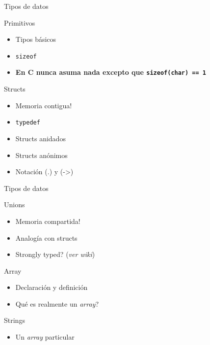 \documentclass{beamer}
\begin{document}
	\begin{frame}{Tipos de datos}
	\begin{block}{Primitivos}
		\begin{itemize}
			\item Tipos básicos
			\item \texttt{sizeof}
			\item \textbf{En C nunca asuma nada excepto que \texttt{sizeof(char) == 1}}
		\end{itemize}
	\end{block}
	
	\begin{block}{Structs}
		\begin{itemize}
			\item Memoria contigua!
			\item \texttt{typedef}
			\item Structs anidados
			\item Structs anónimos
			\item Notación (.) y (-\textgreater)
		\end{itemize}
	\end{block}
	\end{frame}
	
	\begin{frame}{Tipos de datos}
	\begin{block}{Unions}
		\begin{itemize}
			\item Memoria compartida!
			\item Analogía con structs
			\item Strongly typed? (\emph{ver wiki})
		\end{itemize}
	\end{block}
	
	\begin{block}{Array}
		\begin{itemize}
			\item Declaración y definición
			\item Qué es realmente un \emph{array}?
		\end{itemize}
	\end{block}
	
	\begin{block}{Strings}
		\begin{itemize}
			\item Un \emph{array} particular
		\end{itemize}
	\end{block}
	\end{frame}
	
\end{document}
